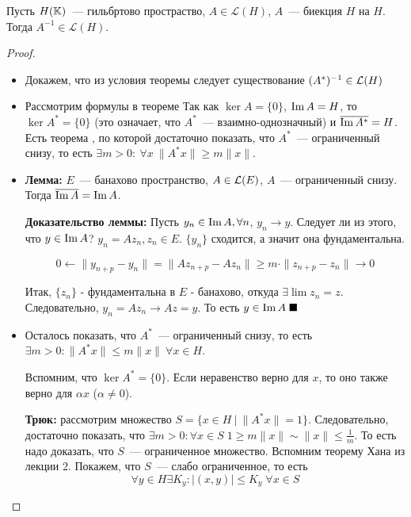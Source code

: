 \begin{theorem}\label{8.4}
     Пусть $H(\mathbb{K})$~--- гильбртово простраство, $A \in \mathcal{L}(H)$,
     $A$~--- биекция $H$ на $H$. Тогда $A^{-1} \in \mathcal{L}(H)$.
\end{theorem}

\begin{proof}  %
    \begin{itemize}
        \item[0.] Докажем, что из условия теоремы следует существование $(A^*)^{-1} \in \mathcal{L}(H)$  %
        \item[1.] Рассмотрим формулы в теореме 
        Так как $\ker A = \{0\}$, $\operatorname{Im} A = H$, то
        $\ker A^* = \{0\}$ (это означает, что
        $A^*$~--- взаимно-однозначный) и $\overline{\operatorname{Im} A^*} = H$.
        Есть теорема , по которой достаточно показать, что
        $A^*$~--- ограниченный снизу, то есть 
        $\exists m > 0:\ \forall x \ \|A^* x\| \geqslant m \|x\|$.
        \item[2.] \textbf{Лемма:} $E$~--- банахово пространство,
        $A \in \mathcal{L}(E)$, $A$~--- ограниченный снизу. 
        Тогда $\overline{\operatorname{Im} A} = \operatorname{Im} A$.
        
        \textbf{Доказательство леммы:} Пусть $y_n \in \operatorname{Im} A, \forall n$, $y_n \to y$. Следует ли из этого, что $y \in \operatorname{Im} A$?
        $y_n = A z_n, z_n \in E$. $\{y_n\}$ сходится, а значит она фундаментальна.
    
        \[ 0 \leftarrow \|y_{n+p}-y_n\|=\|Az_{n+p}-Az_n\| \geq m \cdot \|z_{n+p} - z_n \| \to 0 \] 

        Итак, $\{z_n\}$ - фундаментальна в $E$ - банахово, откуда $\exists \lim z_n = z$. Следовательно, $y_n = A z_n \to A z = y$. То есть $y \in \operatorname{Im} A \; \blacksquare$
        \item[3.] Осталось показать, что $A^*$~--- ограниченный снизу, то есть $\exists m > 0 : \|A^* x\| \leqslant m \|x\| \ \forall x \in H$.

        Вспомним, что $\ker A^* = \{0\}$. Если неравенство верно для $x$, то оно также верно для $\alpha x$ ($\alpha \neq 0$).

        \textbf{Трюк:} рассмотрим множество 
        $S = \{x \in H \: | \: \|A^*x\| = 1\}$. Следовательно, достаточно показать, что $\exists m > 0 : \forall x \in S \; 1 \geqslant m \|x\| \sim \|x\| \leqslant \frac{1}{m}$. То есть надо доказать, что $S$~--- ограниченное множество.
        Вспомним теорему Хана из лекции 2.
        Покажем, что $S$~--- слабо ограниченное, то есть
        \[
        \forall y \in H \exists K_y : |(x, y)| \leqslant K_y \; \forall x \in S
        \]


\end{itemize}
\end{proof}
